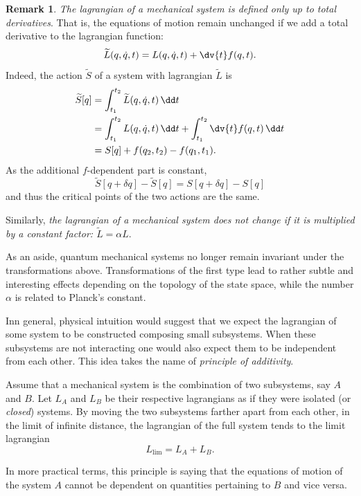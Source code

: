 \documentclass[english,fontsize=11pt,paper=b5]{scrbook}
\theoremstyle{definition}
\newtheorem{remark}{Remark}[chapter]
\newcommand{\emphidx}[1]{\index{#1}\emph{#1}}
\begin{document}
    \begin{remark}\label{rmk:manylagrangians}
      \emph{The lagrangian of a mechanical system is defined only up to total derivatives}.
      That is, the equations of motion remain unchanged if we add a total derivative to the lagrangian function:
      \begin{equation}
        \widetilde L(q,\dot q, t) = L(q, \dot q, t) + \dv{t} f(q,t).
      \end{equation}
      Indeed, the action $\widetilde S$ of a system with lagrangian $\widetilde L$ is
      \begin{align}
        \widetilde S[q] & = \int_{t_1}^{t_2} \widetilde L(q, \dot q, t) \,\dd t                                       \\
                        & = \int_{t_1}^{t_2} L(q, \dot q, t) \,\dd t + \int_{t_1}^{t_2} \dv{t} f(q,t) \,\dd t \\
                        & = S[q] + f(q_2, t_2) - f(q_1, t_1).
      \end{align}
      As the additional $f$-dependent part is constant,
      \begin{equation}
        \widetilde S[q+\delta q] - \widetilde S[q]
        = S[q+\delta q] - S[q]
      \end{equation}
      and thus the critical points of the two actions are the same.

      Similarly, \emph{the lagrangian of a mechanical system does not change if it is multiplied by a constant factor: $\widetilde L = \alpha L$}.

      As an aside, quantum mechanical systems no longer remain invariant under the transformations above. Transformations of the first type lead to rather subtle and interesting effects depending on the topology of the state space, while the number $\alpha$ is related to Planck's constant.
    \end{remark}

    Inn general, physical intuition would suggest that we expect the lagrangian of some system to be constructed composing small subsystems.
    When these subsystems are not interacting one would also expect them to be independent from each other.
    This idea takes the name of \emphidx{principle of additivity}.
    \begin{tcolorbox}[title=Principle of additivity]
      Assume that a mechanical system is the combination of two subsystems, say $A$ and $B$.
      Let $L_A$ and $L_B$ be their respective lagrangians as if they were isolated (or \emph{closed}) systems.
      By moving the two subsystems farther apart from each other, in the limit of infinite distance, the lagrangian of the full system tends to the limit lagrangian
      \begin{equation}
        L_{\lim} = L_A + L_B.
      \end{equation}
    \end{tcolorbox}
    In more practical terms, this principle is saying that the equations of motion of the system $A$ cannot be dependent on quantities pertaining to $B$ and vice versa.
\end{document}
